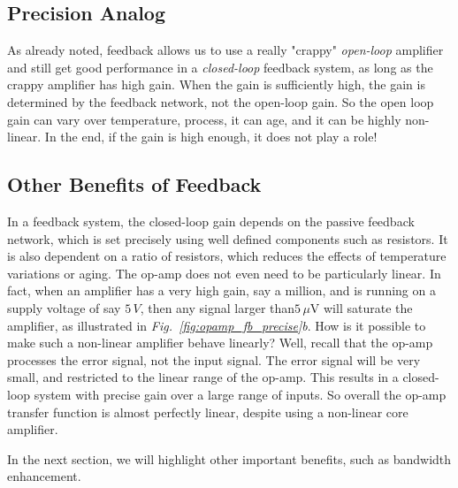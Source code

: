 \subsection{Precision Analog}
As already noted, feedback allows us to use a really "crappy" \textit{open-loop} amplifier and still get good performance in a \textit{closed-loop} feedback system, as long as the crappy amplifier has high gain.  When the gain is sufficiently high, the gain is determined by the feedback network, not the open-loop gain.  So the open loop gain can vary over temperature, process, it can age, and it can be highly non-linear.  In the end, if the gain is high enough, it does not play a role!
\subsection{Other Benefits of Feedback}
In a feedback system, the closed-loop gain depends on the passive feedback network, which is set precisely using well defined components such as resistors.  It is also dependent on a ratio of resistors, which reduces the effects of temperature variations or aging.  The op-amp does not even need to be particularly linear.  In fact, when an amplifier has a very high gain, say a million, and is running on a supply voltage of say $5\,V$, then any signal larger than$ 5\,\mu$V will saturate the amplifier, as illustrated in \emph{Fig.~\ref{fig:opamp_fb_precise}b}.  How is it possible to make such a non-linear amplifier behave linearly?  Well, recall that the op-amp processes the error signal, not the input signal. The error signal will be very small, and restricted to the linear range of the op-amp.  This results in a closed-loop system with precise gain over a large range of inputs.  So overall the op-amp transfer function is almost perfectly linear, despite using a non-linear core amplifier. 

In the next section, we will highlight other important benefits, such as bandwidth enhancement.  
